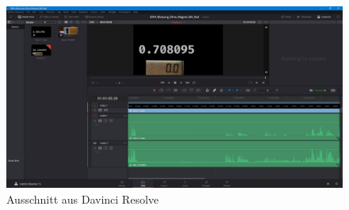 

\begin{figure}[ht]
    \begin{center}
      \includegraphics[width=14cm]{assets/images/resolve_mediapool}
    \end{center}
    \vspace{-3ex}
    \caption{Ausschnitt aus Davinci Resolve}
    \label{fig:resolve_mediapool}
  \end{figure}